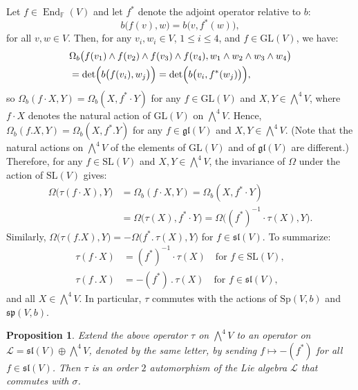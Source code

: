 \documentclass[a4paper,reqno]{amsart}
\newtheorem{proposition}[theorem]{Proposition}
\theoremstyle{definition}
\numberwithin{theorem}{section}
\numberwithin{equation}{section}
\begin{document}
Let $f\in\operatorname{\mathrm{End}}_{\mathbb{F}}(V)$ and let $f^*$ denote the adjoint operator relative to $b$: 
\[
b\bigl(f(v),w\bigr)=b\bigl(v,f^*(w)\bigr),
\] 
for all $v,w\in V$. Then, for any $v_i,w_i\in V$, $1\leq i\leq 4$, and $f\in{\mathrm{GL}}(V)$, we have:
\[
\begin{split}
&\Omega_b\bigl(f(v_1)\wedge f(v_2)\wedge f(v_3)\wedge f(v_4),w_1\wedge w_2\wedge w_3\wedge w_4\bigr)\\
&=\det\Bigl(b\bigl(f(v_i),w_j\bigr)\Bigr)=\det\Bigl(b\bigl(v_i,f^*(w_j)\bigr)\Bigr),
\end{split}
\]
so $\Omega_b(f\cdot X,Y)=\Omega_b(X,f^*\cdot Y)$ for any $f\in{\mathrm{GL}}(V)$ and $X,Y\in\bigwedge^4 V$, where $f\cdot X$ denotes the natural action of ${\mathrm{GL}}(V)$ on $\bigwedge^4 V$. Hence, $\Omega_b(f.X,Y)=\Omega_b(X,f^*.Y)$ for any $f\in{{\mathfrak{gl}}}(V)$ and $X,Y\in\bigwedge^4 V$. (Note that the natural actions on $\bigwedge^4V$ of the elements of ${\mathrm{GL}}(V)$ and of ${{\mathfrak{gl}}}(V)$ are different.) Therefore, for any $f\in{\mathrm{SL}}(V)$ and $X,Y\in\bigwedge^4V$, the invariance of $\Omega$ under the action of ${\mathrm{SL}}(V)$ gives:
\[
\begin{split}
\Omega\bigl(\tau(f\cdot X),Y\bigr)&=\Omega_b(f\cdot X,Y)=\Omega_b(X,f^*\cdot Y)\\
&=\Omega\bigl(\tau(X),f^*\cdot Y\bigr)=\Omega\bigl((f^*)^{-1}\cdot \tau(X),Y\bigr).
\end{split}
\]
Similarly, $\Omega\bigl(\tau(f.X),Y\bigr)=-\Omega\bigl(f^*.\,\tau(X),Y\bigr)$ for $f\in{{\mathfrak{sl}}}(V)$. To summarize:
\begin{align}
\tau(f\cdot X)&=(f^*)^{-1}\cdot\tau(X) \quad\text{for $f\in {\mathrm{SL}}(V)$},\nonumber \\
\tau(f\,.\,X)&=-(f^*)\,.\,\tau(X) \quad\text{for $f\in{{\mathfrak{sl}}}(V)$},\label{eq:tau_ff*}
\end{align}
and all $X\in\bigwedge^4V$. In particular, $\tau$ commutes with the actions of ${\mathrm{Sp}}(V,b)$ and ${{\mathfrak{sp}}}(V,b)$.

\begin{proposition}\label{pr:tau}
Extend the above operator $\tau$ on $\bigwedge^4V$ to an operator on ${\mathcal{L}}={{\mathfrak{sl}}}(V)\oplus\bigwedge^4V$, denoted by the same letter, by sending $f\mapsto -(f^*)$ for all $f\in {{\mathfrak{sl}}}(V)$. Then $\tau$ is an order $2$ automorphism of the Lie algebra ${\mathcal{L}}$ that commutes with $\sigma$.
\end{proposition}
\end{document}

